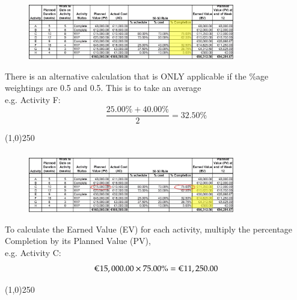 \begin{frame}
\frametitle{}
\begin{figure}
	\centering
		\includegraphics[width = 9cm]{images/evmstep6.jpg}
	\label{fig:evmstep6}
\end{figure}
There is an alternative calculation that is ONLY applicable if the \%age weightings are 0.5 and 0.5. This is to take an average \\ e.g. Activity F: 
\[
\frac{25.00\% + 40.00\%}{2} = 32.50\% 
\]
\end{frame}
\begin{center}\line(1,0){250}\end{center}







\begin{frame}
\frametitle{}
\begin{figure}
	\centering
		\includegraphics[width = 9cm]{images/evmstep7.jpg}
	\label{fig:evmstep7}
\end{figure}
To calculate the Earned Value (EV) for each activity, multiply the percentage Completion by its Planned Value (PV), \\e.g. Activity C: \\
\[
\text{\euro}15,000.00 \times 75.00\% = \text{\euro}11,250.00 
\]
\end{frame}
\begin{center}\line(1,0){250}\end{center}






